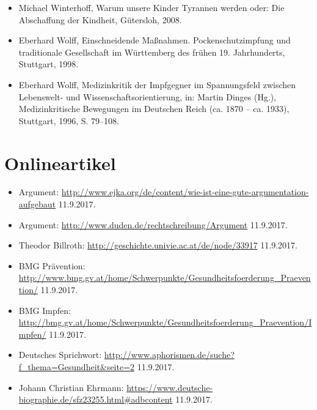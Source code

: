 \documentclass[
    a4paper,
    12pt,
    hyphens,
    chapterprefix=true,
    headheight=33pt,
    footheight=29pt,
    headings=optiontohead, %
]{scrartcl}
\begin{document}
{\begin{itemize}
\item{Michael Winterhoff, Warum unsere Kinder Tyrannen werden oder: Die Abschaffung der Kindheit, Gütersloh, 2008.}
\item{Eberhard Wolff, Einschneidende Maßnahmen. Pockenschutzimpfung und traditionale Gesellschaft im Württemberg des frühen 19. Jahrhunderts, Stuttgart, 1998.}
\item{Eberhard Wolff, Medizinkritik der Impfgegner im Spannungsfeld zwischen Lebenswelt- und Wissenschaftsorientierung, in: Martin Dinges (Hg.), Medizinkritische Bewegungen im Deutschen Reich (ca. 1870 -- ca. 1933), Stuttgart, 1996, S. 79--108.}
\end{itemize}


\newpage

\section{Onlineartikel}

\begin{itemize}
\item{Argument: \url{http://www.ejka.org/de/content/wie-ist-eine-gute-argumentation-aufgebaut} 11.9.2017.}
\item{Argument: \url{http://www.duden.de/rechtschreibung/Argument} 11.9.2017.}
\item{Theodor Billroth: \url{http://geschichte.univie.ac.at/de/node/33917} 11.9.2017.}
\item{BMG Prävention: \url{http://www.bmg.gv.at/home/Schwerpunkte/Gesundheitsfoerderung_Praevention/} 11.9.2017.}
\item{BMG Impfen: \url{http://bmg.gv.at/home/Schwerpunkte/Gesundheitsfoerderung_Praevention/Impfen/} 11.9.2017.}
\item{Deutsches Sprichwort: \url{http://www.aphorismen.de/suche?f_thema=Gesundheit&seite=2} 11.9.2017.}
\item{Johann Christian Ehrmann: \url{https://www.deutsche-biographie.de/sfz23255.html#adbcontent} 11.9.2017.}


\end{itemize}}
\end{document}
